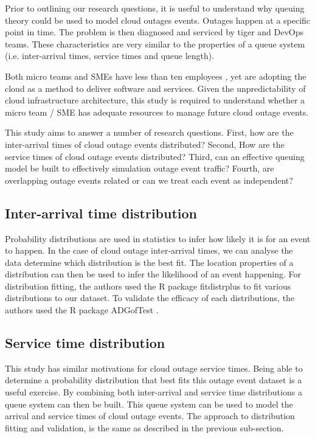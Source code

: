\documentclass[5p]{elsarticle}
\begin{document}
Prior to outlining our research questions, it is useful to understand why queuing theory could be used to model cloud outages events. Outages happen at a specific point in time. The problem is then diagnosed and serviced by tiger and DevOps teams. These characteristics are very similar to the properties of a queue system (i.e. inter-arrival times, service times and queue length). 

Both micro teams and SMEs have less than ten employees \cite{eusmereport2015}, yet are adopting the cloud as a method to deliver software and services. Given the unpredictability of cloud infrastructure architecture, this study is required to understand whether a micro team / SME has adequate resources to manage future cloud outage events. 

This study aims to answer a number of research questions. First, how are the inter-arrival times of cloud outage events distributed? Second, How are the service times of cloud outage events distributed?  Third, can an effective queuing model be built to effectively simulation outage event traffic? Fourth, are overlapping outage events related or can we treat each event as independent? 

\subsection{Inter-arrival time distribution}

Probability distributions are used in statistics to infer how likely it is for an event to happen. In the case of cloud outage inter-arrival times,  we can analyse the data determine which distribution is the best fit. The location properties of a distribution can then be used to infer the likelihood of an event happening. For distribution fitting, the authors used the R package fitdistrplus \cite{fitdistrplus} to fit various distributions to our dataset. To validate the efficacy of each distributions,  the authors used the R package ADGofTest \cite{ADGoF}. 

\subsection{Service time distribution}

This study has similar motivations for cloud outage service times. Being able to determine a probability distribution that best fits this outage event dataset is a useful exercise. By combining both inter-arrival and service time distributions a queue system can then be built. This queue system can be used to model the arrival and service times of cloud outage events. The approach to distribution fitting and validation, is the same as described in the previous sub-section. 
\end{document}

